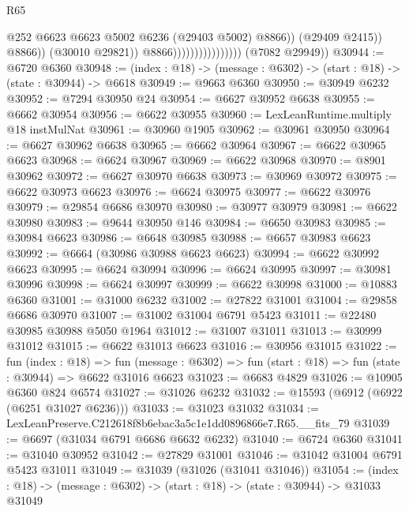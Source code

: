 \begin{lexlean}{R65}
\begin{coremodule}
{                                                  @252
                                                  @6623
                                                  @6623
                                                  @5002
                                                  @6236
                                                  (@29403 @5002)
                                                  @8866))
                                              (@29409 @2415))
                                            @8866))
                                        (@30010 @29821))
                                      @8866))))))))))))))))
      (@7082 @29949))
@30944 := @6720 @6360
@30948 := (index : @18) -> (message : @6302) -> (start : @18) -> (state : @30944) -> @6618
@30949 := @9663 @6360
@30950 := @30949 @6232
@30952 := @7294 @30950 @24
@30954 := @6627 @30952 @6638
@30955 := @6662 @30954
@30956 := @6622 @30955
@30960 := LexLeanRuntime.multiply @18 instMulNat
@30961 := @30960 @1905
@30962 := @30961 @30950
@30964 := @6627 @30962 @6638
@30965 := @6662 @30964
@30967 := @6622 @30965 @6623
@30968 := @6624 @30967
@30969 := @6622 @30968
@30970 := @8901 @30962
@30972 := @6627 @30970 @6638
@30973 := @30969 @30972
@30975 := @6622 @30973 @6623
@30976 := @6624 @30975
@30977 := @6622 @30976
@30979 := @29854 @6686 @30970
@30980 := @30977 @30979
@30981 := @6622 @30980
@30983 := @9644 @30950 @146
@30984 := @6650 @30983
@30985 := @30984 @6623
@30986 := @6648 @30985
@30988 := @6657 @30983 @6623
@30992 := @6664 (@30986 @30988 @6623 @6623)
@30994 := @6622 @30992 @6623
@30995 := @6624 @30994
@30996 := @6624 @30995
@30997 := @30981 @30996
@30998 := @6624 @30997
@30999 := @6622 @30998
@31000 := @10883 @6360
@31001 := @31000 @6232
@31002 := @27822 @31001
@31004 := @29858 @6686 @30970
@31007 := @31002 @31004 @6791 @5423
@31011 := @22480 @30985 @30988 @5050 @1964
@31012 := @31007 @31011
@31013 := @30999 @31012
@31015 := @6622 @31013 @6623
@31016 := @30956 @31015
@31022 := fun (index : @18) =>
  fun (message : @6302) => fun (start : @18) => fun (state : @30944) => @6622 @31016 @6623
@31023 := @6683 @4829
@31026 := @10905 @6360 @824 @6574
@31027 := @31026 @6232
@31032 := @15593 (@6912 (@6922 (@6251 @31027 @6236)))
@31033 := @31023 @31032
@31034 := LexLeanPreserve.C212618f8b6ebac3a5c1e1dd0896866e7.R65.__fits_79
@31039 := @6697 (@31034 @6791 @6686 @6632 @6232)
@31040 := @6724 @6360
@31041 := @31040 @30952
@31042 := @27829 @31001
@31046 := @31042 @31004 @6791 @5423 @31011
@31049 := @31039 (@31026 (@31041 @31046))
@31054 := (index : @18) -> (message : @6302) -> (start : @18) -> (state : @30944) -> @31033 @31049
}
\end{coremodule}
\end{lexlean}
